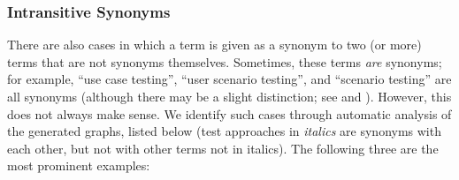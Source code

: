\subsubsection{Intransitive Synonyms}\label{multiSyns}
There are also cases in which a term is given as a synonym to two (or more)
terms that are not synonyms themselves. Sometimes, these terms
\emph{are} synonyms; for example, \citetISTQB{} 
``use case testing'', ``user scenario testing'', and ``scenario testing'' are
all synonyms (although there may be a slight distinction; see
 and ).
%
%
%
%
However, this does not always make sense. We identify \multiSynCount{}
such cases through automatic analysis of the generated graphs\ifnotpaper,
listed below (test approaches in \emph{italics} are synonyms with each other,
but not with other terms not in italics)\else. The following three are the most prominent examples\fi:

\begin{enumerate}
    
\end{enumerate}
